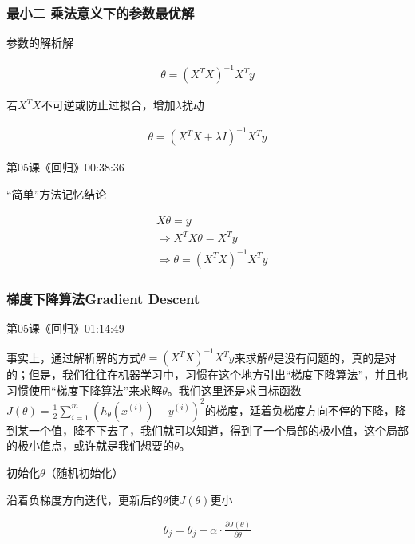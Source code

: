 \documentclass[UTF8]{ctexart}
\begin{document}
\subsubsection{最小二 乘法意义下的参数最优解}

参数的解析解

\begin{equation}
\begin{aligned}
\theta=(X^{T}X)^{-1} X^{T}y
\end{aligned}
\end{equation}

若$X^{T}X$不可逆或防止过拟合，增加$\lambda$扰动

\begin{equation}
\begin{aligned}
\theta=(X^{T}X+\lambda I)^{-1} X^{T}y
\end{aligned}
\end{equation}

第05课《回归》00:38:36

“简单”方法记忆结论

\begin{equation}
\begin{aligned}
&X\theta=y\\
&\Rightarrow X^{T}X\theta=X^{T}y\\
&\Rightarrow \theta = (X^{T}X)^{-1} X^{T}y
\end{aligned}
\end{equation}

\subsubsection{梯度下降算法Gradient Descent}

第05课《回归》01:14:49

事实上，通过解析解的方式$\theta = (X^{T}X)^{-1} X^{T}y$来求解$\theta$是没有问题的，真的是对的；但是，我们往往在机器学习中，习惯在这个地方引出“梯度下降算法”，并且也习惯使用“梯度下降算法”来求解$\theta$。我们这里还是求目标函数$J(\theta)=\frac{1}{2} \sum_{i=1}^{m}(h_{\theta}(x^{(i)}) - y^{(i)})^{2}$的梯度，延着负梯度方向不停的下降，降到某一个值，降不下去了，我们就可以知道，得到了一个局部的极小值，这个局部的极小值点，或许就是我们想要的$\theta$。

初始化$\theta$（随机初始化）

沿着负梯度方向迭代，更新后的$\theta$使$J(\theta)$更小

\begin{equation}
\begin{aligned}
\theta_{j}=\theta_{j}-\alpha \cdot \frac{\partial J(\theta)}{\partial \theta}
\end{aligned}
\end{equation}
\end{document}

